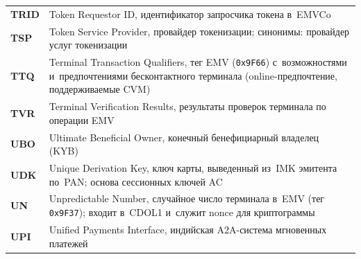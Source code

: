 \begin{longtable}{@{}p{4.5em}p{\dimexpr\linewidth-4.5em-2\tabcolsep\relax}@{}}
  \textbf{TRID}              & Token Requestor ID, идентификатор запросчика токена в~EMVCo                                                                                                                                                                                                                                      \\
  \textbf{TSP}               & Token Service Provider, провайдер токенизации; синонимы: провайдер услуг токенизации                                                                                                                                                                                                             \\
  \textbf{TTQ}               & Terminal Transaction Qualifiers, тег EMV (\texttt{0x9F66}) с~возможностями и~предпочтениями бесконтактного терминала (online-предпочтение, поддерживаемые CVM)                                                                                                                                    \\
  \textbf{TVR}               & Terminal Verification Results, результаты проверок терминала по операции EMV                                                                                                                                                                                                                     \\
  \textbf{UBO}               & Ultimate Beneficial Owner, конечный бенефициарный владелец (KYB)                                                                                                                                                                                                                                 \\
  \textbf{UDK}               & Unique Derivation Key, ключ карты, выведенный из~IMK эмитента по~PAN; основа сессионных ключей AC                                                                                                                                                                                              \\
  \textbf{UN}                & Unpredictable Number, случайное число терминала в~EMV (тег \texttt{0x9F37}); входит в~CDOL1 и~служит nonce для криптограммы                                                                                                                                                                       \\
  \textbf{UPI}               & Unified Payments Interface, индийская A2A-система мгновенных платежей                                                                                                                                                                                                                             \\

\end{longtable}
